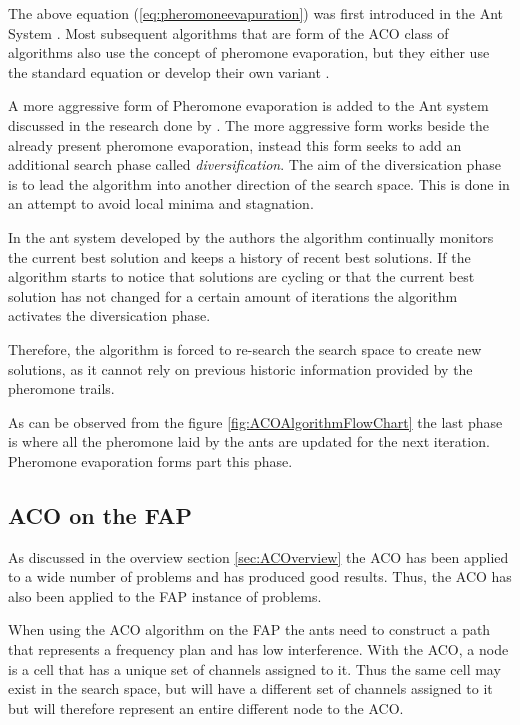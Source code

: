 The above equation (\ref{eq:pheromoneevapuration}) was first introduced in the Ant System \cite{CompuIntelligenceIntro,AntsAndStigmergy,AntIntroTrends,AntSurvey}. Most subsequent algorithms that are form of the ACO class of algorithms also use the concept of pheromone evaporation, but they either use the standard equation or develop their own variant \cite{CompuIntelligenceIntro,AntsAndStigmergy,AntIntroTrends,AntSurvey}.

A more aggressive form of Pheromone evaporation  is added to the Ant system discussed in the research done by \cite{AntQAP}. The more aggressive form works beside the already present pheromone evaporation, instead this form seeks to add an additional search phase called \emph{diversification}\cite{AntQAP}. The aim of the diversication phase is to lead the algorithm into another direction of the search space\cite{AntQAP}. This is done in an attempt to avoid local minima and stagnation\cite{AntQAP}.

In the ant system developed by the authors the algorithm continually monitors the current best solution and keeps a history of recent best solutions\cite{AntQAP}. If the algorithm starts to notice that solutions are cycling or that the current best solution has not changed for a certain amount of iterations the algorithm activates the diversication phase\cite{AntQAP}. 

Therefore, the algorithm is forced to re-search the search space to create new solutions, as it cannot rely on previous historic information provided by the pheromone trails\cite{AntQAP}.

As can be observed from the figure \ref{fig:ACOAlgorithmFlowChart} the last phase is where all the pheromone laid by the ants are updated for the next iteration. Pheromone evaporation forms part this phase.
\subsection{ACO on the FAP}
As discussed in the overview section \ref{sec:ACOverview} the ACO has been applied to a wide number of problems and has produced good results. Thus, the ACO has also been applied to the FAP instance of problems.

When using the ACO algorithm on the FAP the ants need to construct a path that represents a frequency plan and has low interference. With the ACO, a node is a cell that has a unique set of channels assigned to it. Thus the same cell may exist in the search space, but will have a different set of channels assigned to it but will therefore represent an entire different node to the ACO.

